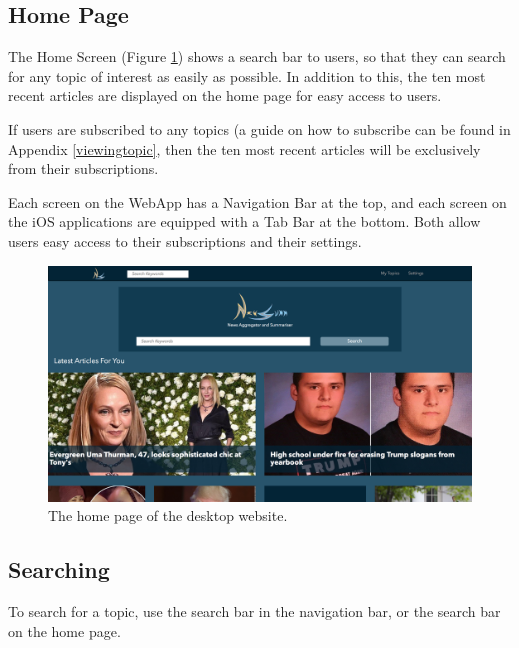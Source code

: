 \documentclass[12pt]{article}
\begin{document}
\begin{appendices}
\subsection{Home Page}

The Home Screen (Figure \ref{desktophome}) shows a search bar to users, so that they can search for any topic of interest as easily as possible. In addition to this, the ten most recent articles are displayed on the home page for easy access to users. 

If users are subscribed to any topics (a guide on how to subscribe can be found in Appendix \ref{viewingtopic}, then the ten most recent articles will be exclusively from their subscriptions.

Each screen on the WebApp has a Navigation Bar at the top, and each screen on the iOS applications are equipped with a Tab Bar at the bottom. Both allow users easy access to their subscriptions and their settings.

\begin{figure}[ht!]
  \centering
        \includegraphics[width=\textwidth]{desktophome.PNG}
        \caption{The home page of the desktop website.}
   \label{desktophome}
\end{figure}

\subsection{Searching}

To search for a topic, use the search bar in the navigation bar, or the search bar on the home page.


\end{appendices}
\end{document}
